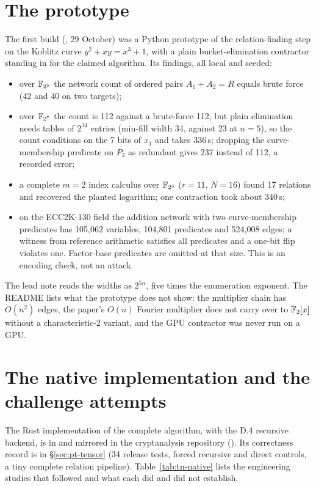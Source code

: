 \section{The prototype}\label{sec:tn-prototype}

The first build (, 29 October) was
a Python prototype of the relation-finding step on the Koblitz curve
$y^2+xy=x^3+1$, with a plain bucket-elimination contractor standing in for
the claimed algorithm. Its findings, all local and seeded:
\begin{itemize}
\item over $\mathbb{F}_{2^5}$ the network count of ordered pairs
  $A_1+A_2=R$ equals brute force (42 and 40 on two targets);
\item over $\mathbb{F}_{2^7}$ the count is 112 against a brute-force 112, but plain
  elimination needs tables of $2^{34}$ entries (min-fill width 34, against
  23 at $n=5$), so the count conditions on the 7 bits of $x_1$ and takes
  336\,s; dropping the curve-membership predicate on $P_2$ as redundant
  gives 237 instead of 112, a recorded error;
\item a complete $m=2$ index calculus over $\mathbb{F}_{2^5}$ ($r=11$, $N=16$) found
  17 relations and recovered the planted logarithm; one contraction took
  about 340\,s;
\item on the ECC2K-130 field the addition network with two
  curve-membership predicates has 105{,}062 variables, 104{,}801 predicates
  and 524{,}008 edges; a witness from reference arithmetic satisfies all
  predicates and a one-bit flip violates one. Factor-base predicates are
  omitted at that size. This is an encoding check, not an attack.
\end{itemize}
The lead note reads the widths as $2^{5n}$, five times the enumeration
exponent. The README lists what the prototype does not show: the multiplier
chain has $O(n^2)$ edges, the paper's $O(n)$ Fourier multiplier does not carry
over to $\mathbb{F}_2[x]$ without a characteristic-2 variant, and the GPU
contractor was never run on a GPU.

\section{The native implementation and the challenge attempts}\label{sec:tn-native}

The Rust implementation of the complete algorithm, with the D.4 recursive
backend, is in  and mirrored in the
cryptanalysis repository (). Its correctness
record is in \S\ref{sec:pt-tensor} (34 release tests, forced recursive and
direct controls, a tiny complete relation pipeline). Table~\ref{tab:tn-native}
lists the engineering studies that followed and what each did and did not
establish.

